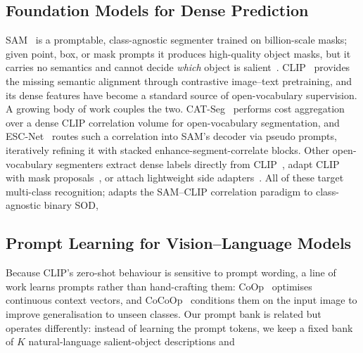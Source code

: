 \subsection{Foundation Models for Dense Prediction}
SAM~\cite{kirillov2023segment} is a promptable, class-agnostic segmenter trained
on billion-scale masks; given point, box, or mask prompts it produces high-quality
object masks, but it carries no semantics and cannot decide \emph{which} object is
salient~\cite{wu2023samsurvey}. CLIP~\cite{radford2021learning} provides the
missing semantic alignment through contrastive image--text pretraining, and its
dense features have become a standard source of open-vocabulary supervision.
A growing body of work couples the two. CAT-Seg~\cite{cho2024cat} performs
cost aggregation over a dense CLIP correlation volume for open-vocabulary
segmentation, and ESC-Net~\cite{lee2024escnet} routes such a correlation into
SAM's decoder via pseudo prompts, iteratively refining it with stacked
enhance-segment-correlate blocks. Other open-vocabulary segmenters extract dense
labels directly from CLIP~\cite{zhou2022maskclip}, adapt CLIP with mask
proposals~\cite{liang2023ovseg}, or attach lightweight side
adapters~\cite{xu2023sanlang}. All of these target multi-class recognition;
\methodname{} adapts the SAM--CLIP correlation paradigm to class-agnostic binary
SOD, 

\subsection{Prompt Learning for Vision--Language Models}
Because CLIP's zero-shot behaviour is sensitive to prompt wording, a line of work
learns prompts rather than hand-crafting them: CoOp~\cite{zhou2022coop} optimises
continuous context vectors, and CoCoOp~\cite{zhou2022cocoop} conditions them on
the input image to improve generalisation to unseen classes. Our prompt bank
is related but operates differently: instead of learning the prompt tokens, we keep
a fixed bank of $K$ natural-language salient-object descriptions and 
